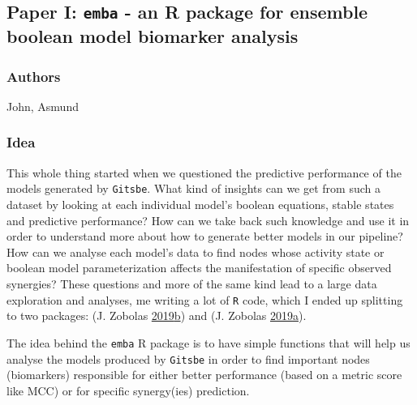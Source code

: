 \documentclass[
  12pt,
]{book}
\begin{document}
\hypertarget{paper-i-emba---an-r-package-for-ensemble-boolean-model-biomarker-analysis}{%
\subsection*{\texorpdfstring{Paper I: \texttt{emba} - an R package for ensemble boolean model biomarker analysis}{Paper I: emba - an R package for ensemble boolean model biomarker analysis}}\label{paper-i-emba---an-r-package-for-ensemble-boolean-model-biomarker-analysis}}

\hypertarget{authors}{%
\subsubsection*{Authors}\label{authors}}

John, Asmund

\hypertarget{idea}{%
\subsubsection*{Idea}\label{idea}}

This whole thing started when we questioned the predictive performance of the models generated by \texttt{Gitsbe}.
What kind of insights can we get from such a dataset by looking at each individual model's boolean equations, stable states and predictive performance?
How can we take back such knowledge and use it in order to understand more about how to generate better models in our pipeline?
How can we analyse each model's data to find nodes whose activity state or boolean model parameterization affects the manifestation of specific observed synergies?
These questions and more of the same kind lead to a large data exploration and analyses, me writing a lot of \texttt{R} code, which I ended up splitting to two packages: (J. Zobolas \protect\hyperlink{ref-R-usefun}{2019}\protect\hyperlink{ref-R-usefun}{b}) and (J. Zobolas \protect\hyperlink{ref-R-emba}{2019}\protect\hyperlink{ref-R-emba}{a}).

The idea behind the \texttt{emba} R package is to have simple functions that will help us analyse the models produced by \texttt{Gitsbe} in order to find important nodes (biomarkers) responsible for either better performance (based on a metric score like MCC) or for specific synergy(ies) prediction.
\end{document}
